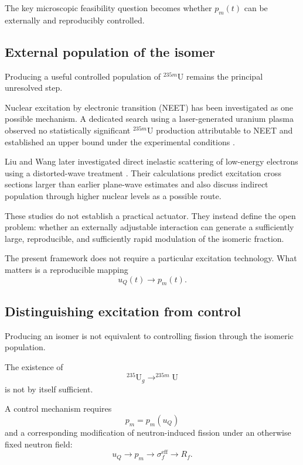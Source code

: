 The key microscopic feasibility question becomes whether $p_m(t)$ can be externally and reproducibly controlled.

\subsection{External population of the isomer}

Producing a useful controlled population of $^{235m}$U remains the principal unresolved step.

Nuclear excitation by electronic transition (NEET) has been investigated as one possible mechanism. A dedicated search using a laser-generated uranium plasma observed no statistically significant $^{235m}$U production attributable to NEET and established an upper bound under the experimental conditions \cite{Chodash2016}.

Liu and Wang later investigated direct inelastic scattering of low-energy electrons using a distorted-wave treatment \cite{LiuWang2022}. Their calculations predict excitation cross sections larger than earlier plane-wave estimates and also discuss indirect population through higher nuclear levels as a possible route.

These studies do not establish a practical actuator. They instead define the open problem: whether an externally adjustable interaction can generate a sufficiently large, reproducible, and sufficiently rapid modulation of the isomeric fraction.

The present framework does not require a particular excitation technology. What matters is a reproducible mapping
\begin{equation}
u_Q(t)
\rightarrow
p_m(t).
\end{equation}

\subsection{Distinguishing excitation from control}

Producing an isomer is not equivalent to controlling fission through the isomeric population.

The existence of
\begin{equation}
^{235}\mathrm{U}_g
\rightarrow
^{235m}\mathrm{U}
\end{equation}
is not by itself sufficient.

A control mechanism requires
\begin{equation}
p_m=p_m(u_Q)
\end{equation}
and a corresponding modification of neutron-induced fission under an otherwise fixed neutron field:
\begin{equation}
\boxed{
u_Q
\rightarrow
p_m
\rightarrow
\sigma_f^{\mathrm{eff}}
\rightarrow
R_f
}.
\end{equation}

